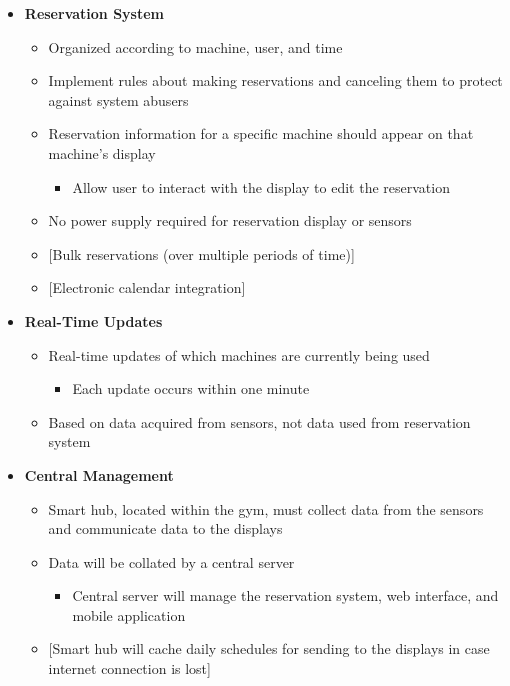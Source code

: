 \documentclass[letterpaper,11pt]{./templates/texMemo} %
\begin{document}
\begin{itemize}
    \item{\textbf{Reservation System}}
    \begin{itemize}
        \item{Organized according to machine, user, and time}
        \item{Implement rules about making reservations and canceling them to protect against system abusers}
        \item{Reservation information for a specific machine should appear on that machine's display}
        \begin{itemize}
            \item{Allow user to interact with the display to edit the reservation}
        \end{itemize}
        \item{No power supply required for reservation display or sensors}
        \item{[Bulk reservations (over multiple periods of time)]}
        \item{[Electronic calendar integration]}
    \end{itemize}

    \item{\textbf{Real-Time Updates}}
    \begin{itemize}
        \item{Real-time updates of which machines are currently being used}
        \begin{itemize}
            \item{Each update occurs within one minute}
        \end{itemize}
        \item{Based on data acquired from sensors, not data used from reservation system}
    \end{itemize}

    \item{\textbf{Central Management}}
    \begin{itemize}
        \item{Smart hub, located within the gym, must collect data from the sensors and communicate data to the displays}
        \item{Data will be collated by a central server}
        \begin{itemize}
            \item{Central server will manage the reservation system, web interface, and mobile application}
        \end{itemize}
        \item{[Smart hub will cache daily schedules for sending to the displays in case internet connection is lost]}
    \end{itemize}
    \end{itemize}
\end{document}
